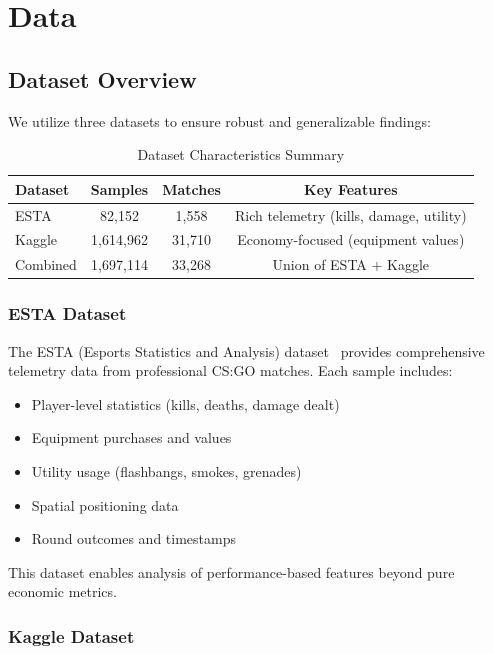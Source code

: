 \documentclass[11pt]{article}
\begin{document}
\section{Data}
\label{sec:data}

\subsection{Dataset Overview}

We utilize three datasets to ensure robust and generalizable findings:

\begin{table}[h]
\centering
\caption{Dataset Characteristics Summary}
\begin{tabular}{lccc}
\toprule
\textbf{Dataset} & \textbf{Samples} & \textbf{Matches} & \textbf{Key Features} \\
\midrule
ESTA & 82,152 & 1,558 & Rich telemetry (kills, damage, utility) \\
Kaggle & 1,614,962 & 31,710 & Economy-focused (equipment values) \\
Combined & 1,697,114 & 33,268 & Union of ESTA + Kaggle \\
\bottomrule
\end{tabular}
\end{table}

\subsubsection{ESTA Dataset}

The ESTA (Esports Statistics and Analysis) dataset~\cite{xenopoulos2020} provides comprehensive telemetry data from professional CS:GO matches. Each sample includes:
\begin{itemize}
    \item Player-level statistics (kills, deaths, damage dealt)
    \item Equipment purchases and values
    \item Utility usage (flashbangs, smokes, grenades)
    \item Spatial positioning data
    \item Round outcomes and timestamps
\end{itemize}

This dataset enables analysis of performance-based features beyond pure economic metrics.

\subsubsection{Kaggle Dataset}
\end{document}
